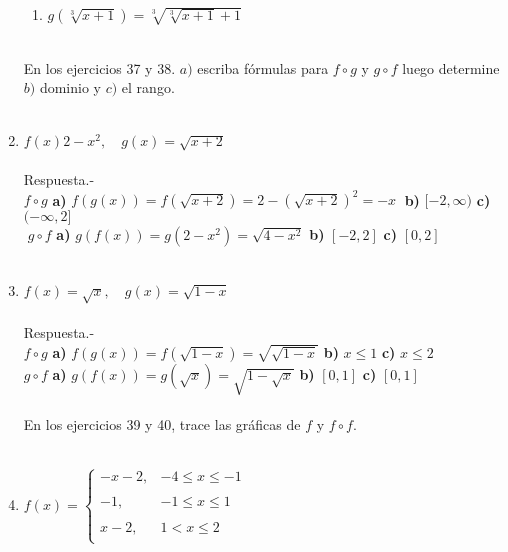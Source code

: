 \begin{enumerate}
\begin{enumerate}[\bfseries a)]
	\item $g(\sqrt[3]{x+1}) = \sqrt[3]{\sqrt[3]{x+1}+1}$\\\\

    \end{enumerate}

En los ejercicios 37 y 38. $a)$ escriba fórmulas para $f\circ g$ y $g\circ f$ luego determine $b)$ dominio y $c)$ el rango.\\\\

\item $f(x) 2 - x^2, \quad g(x) = \sqrt{x+2}$\\\\
    Respuesta.-\; \\ $f\circ g$ \textbf{a)} $f(g(x)) = f(\sqrt{x+2}) = 2 - (\sqrt{x+2})^2 = -x\;$ \textbf{b)} $[-2,\infty)$ \textbf{c)} $(-\infty,2]$ \\
    $\;g\circ f$ \textbf{a)} $g(f(x)) = g(2-x^2) = \sqrt{4-x^2}$ \textbf{b)} $[-2,2]$ \textbf{c)} $[0,2]$\\\\



\item $f(x) = \sqrt{x},\quad g(x) = \sqrt{1-x}$\\\\
    Respuesta.-\; \\
    $f\circ g$ \textbf{a)} $f(g(x)) = f(\sqrt{1 - x}) =  \sqrt{\sqrt{1 - x}}$ \textbf{b)} $x\leq 1$ \textbf{c)} $x\leq 2$\\
    $g\circ f$ \textbf{a)} $g(f(x)) = g(\sqrt{x}) = \sqrt{1 - \sqrt{x}}$ \textbf{b)} $[0,1]$ \textbf{c)} $[0,1]$\\\\

En los ejercicios 39 y 40, trace las gráficas de $f$ y $f\circ f$.\\\\

\item $f(x) =  \left\{\begin{array}{lr}
	-x-2,&-4\leq x \leq -1\\\\
	-1,&-1\leq x \leq 1\\\\
	x-2,&1<x\leq 2\\
    \end{array}\right.$
    \vspace{.5cm}


\end{enumerate}
